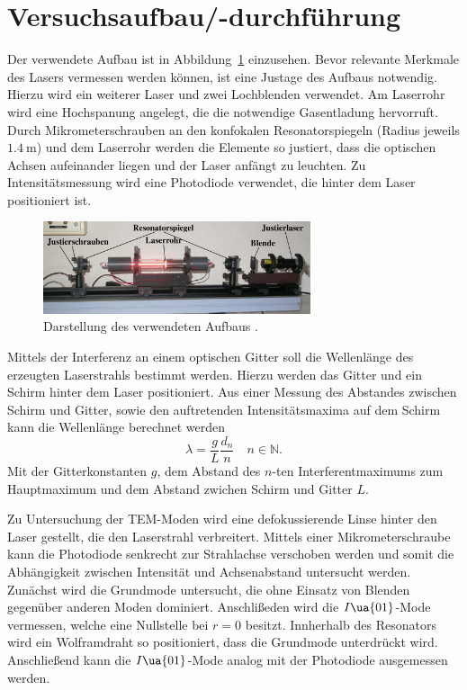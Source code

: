 \section{Versuchsaufbau/-durchführung}
Der verwendete Aufbau ist in Abbildung~\ref{fig: aufbau} einzusehen. Bevor relevante Merkmale des Lasers vermessen werden können, ist eine
Justage des Aufbaus notwendig. Hierzu wird ein weiterer Laser und zwei Lochblenden verwendet. Am Laserrohr wird eine Hochspanung
angelegt, die die notwendige Gasentladung hervorruft. Durch Mikrometerschrauben an den konfokalen Resonatorspiegeln (Radius jeweils $\SI{1.4}{\meter}$)
und dem Laserrohr werden die Elemente so justiert, dass die optischen Achsen aufeinander liegen und der Laser anfängt zu leuchten.
Zu Intensitätsmessung wird eine Photodiode verwendet, die hinter dem Laser positioniert ist.
\begin{figure}
  \centering
  \includegraphics[width = 0.7\textwidth]{theorie_bilder/aufbau.png}
  \caption{Darstellung des verwendeten Aufbaus \cite{anleitung61}.}
  \label{fig: aufbau}
\end{figure}

Mittels der Interferenz an einem optischen Gitter soll die Wellenlänge des erzeugten Laserstrahls bestimmt werden. Hierzu werden das Gitter
und ein Schirm hinter dem Laser positioniert. Aus einer Messung des Abstandes zwischen Schirm und Gitter, sowie den auftretenden Intensitätsmaxima
auf dem Schirm kann die Wellenlänge berechnet werden
\begin{equation}
  \lambda = \frac{g }{L }\frac{d_{n}}{n} \quad n \in \mathbb{N}.
\end{equation}
Mit der Gitterkonstanten $g$, dem Abstand des $n$-ten Interferentmaximums zum Hauptmaximum und dem Abstand zwichen Schirm und Gitter $L$.

Zu Untersuchung der TEM-Moden wird eine defokussierende Linse hinter den Laser gestellt, die den Laserstrahl verbreitert.
Mittels einer Mikrometerschraube kann die Photodiode
senkrecht zur Strahlachse verschoben werden und somit die Abhängigkeit zwischen Intensität und Achsenabstand untersucht werden. Zunächst
wird die Grundmode untersucht, die ohne Einsatz von Blenden gegenüber anderen Moden dominiert. Anschlißeden wird die $I\ua{01}$-Mode
vermessen, welche eine Nullstelle bei $r = 0$ besitzt. Innherhalb des Resonators wird ein Wolframdraht so positioniert, dass die Grundmode
unterdrückt wird. Anschließend kann die $I\ua{01}$-Mode analog mit der Photodiode ausgemessen werden.


